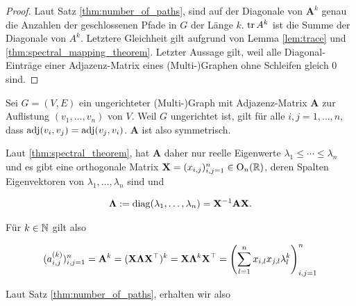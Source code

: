         \begin{proof}

            Laut Satz \ref{thm:number_of_paths}, sind auf der Diagonale von $\mathbf A^k$ genau die Anzahlen der geschlossenen Pfade in $G$ der Länge $k$.
            $\operatorname{tr} A^k$ ist die Summe der Diagonale von $A^k$.
            Letztere Gleichheit gilt aufgrund von Lemma \ref{lem:trace} und \ref{thm:spectral_mapping_theorem}.
            Letzter Aussage gilt, weil alle Diagonal-Einträge einer Adjazenz-Matrix eines (Multi-)Graphen ohne Schleifen gleich $0$ sind.

        \end{proof}

        \begin{remark} \label{rem:number_of_paths_undirected}

            Sei $G = (V, E)$ ein ungerichteter (Multi-)Graph mit Adjazenz-Matrix $\mathbf A$ zur Auflistung $(v_1, \dots, v_n)$ von $V$.
            Weil $G$ ungerichtet ist, gilt für alle $i, j = 1, \dots, n$, dass $\operatorname{adj}(v_i, v_j) = \operatorname{adj}(v_j, v_i)$.
            $\mathbf A$ ist also symmetrisch.

            Laut \ref{thm:spectral_theorem}, hat $\mathbf A$ daher nur reelle Eigenwerte $\lambda_1 \leq \cdots \leq \lambda_n$ und es gibt eine orthogonale Matrix $\mathbf X = (x_{i,j})_{i,j=1}^n \in \operatorname O_n(\mathbb R)$, deren Spalten Eigenvektoren von $\lambda_1, \dots, \lambda_n$ sind und

            \begin{align*}
                \mathbf \Lambda
                :=
                \operatorname{diag}(\lambda_1, \dots, \lambda_n)
                =
                \mathbf X^{-1} \mathbf A \mathbf X.
            \end{align*}

            Für $k \in \mathbb N$ gilt also

            \begin{align*}
                (a_{i,j}^{(k)})_{i,j=1}^n
                =
                \mathbf A^k
                =
                (\mathbf X \mathbf \Lambda \mathbf X^\top)^k
                =
                \mathbf X \mathbf \Lambda^k \mathbf X^\top
                =
                {\left ( 
                    \sum_{l=1}^n
                        x_{i,l} x_{j,l} \lambda_l^k
                 \right )}_{i,j=1}^n
            \end{align*}

            Laut Satz \ref{thm:number_of_paths}, erhalten wir also


\end{remark}
